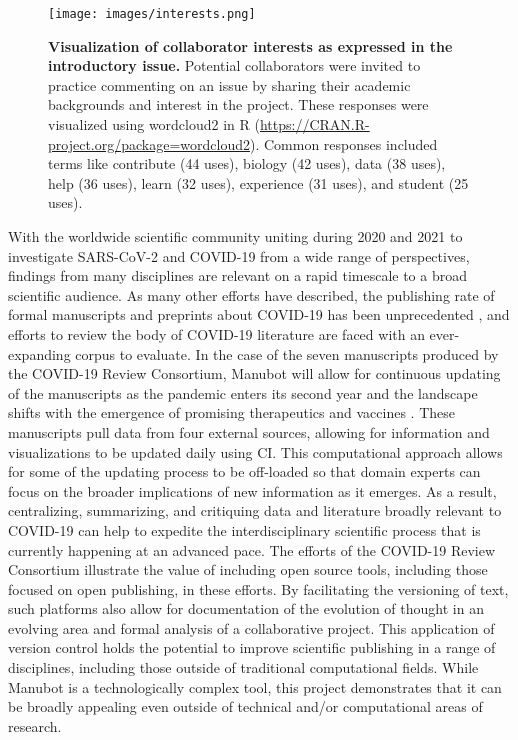 \documentclass[twocolumn]{ceurart}
\begin{document}
\begin{figure}
\hypertarget{fig:wordcloud}{%
\centering
\texttt{[image: images/interests.png]}
\caption{\textbf{Visualization of collaborator interests as expressed in the introductory issue.}
Potential collaborators were invited to practice commenting on an issue by sharing their academic backgrounds and interest in the project.
These responses were visualized using wordcloud2 in R (\url{https://CRAN.R-project.org/package=wordcloud2}).
Common responses included terms like contribute (44 uses), biology (42 uses), data (38 uses), help (36 uses), learn (32 uses), experience (31 uses), and student (25 uses).}\label{fig:wordcloud}
}
\end{figure}

With the worldwide scientific community uniting during 2020 and 2021 to investigate SARS-CoV-2 and COVID-19 from a wide range of perspectives, findings from many disciplines are relevant on a rapid timescale to a broad scientific audience.
As many other efforts have described, the publishing rate of formal manuscripts and preprints about COVID-19 has been unprecedented \citep{7ub6VM4Z}, and efforts to review the body of COVID-19 literature are faced with an ever-expanding corpus to evaluate.
In the case of the seven manuscripts produced by the COVID-19 Review Consortium, Manubot will allow for continuous updating of the manuscripts as the pandemic enters its second year and the landscape shifts with the emergence of promising therapeutics and vaccines \citep{cifK9B8t, i2CGFwI3}.
These manuscripts pull data from four external sources, allowing for information and visualizations to be updated daily using CI.
This computational approach allows for some of the updating process to be off-loaded so that domain experts can focus on the broader implications of new information as it emerges.
As a result, centralizing, summarizing, and critiquing data and literature broadly relevant to COVID-19 can help to expedite the interdisciplinary scientific process that is currently happening at an advanced pace.
The efforts of the COVID-19 Review Consortium illustrate the value of including open source tools, including those focused on open publishing, in these efforts.
By facilitating the versioning of text, such platforms also allow for documentation of the evolution of thought in an evolving area and formal analysis of a collaborative project.
This application of version control holds the potential to improve scientific publishing in a range of disciplines, including those outside of traditional computational fields.
While Manubot is a technologically complex tool, this project demonstrates that it can be broadly appealing even outside of technical and/or computational areas of research.
\end{document}
